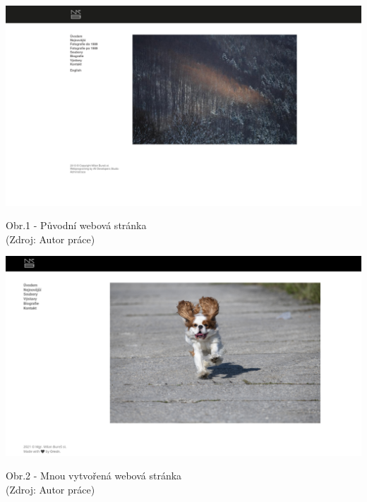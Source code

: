 \documentclass[12pt,a4paper]{report}
\begin{document}
  \vspace*{0.5cm}
  \noindent\includegraphics[width=\linewidth]{milanburescz.png}
  \begin{center}
    Obr.1 - Původní webová stránka \\
    (Zdroj: Autor práce)
  \end{center}
  \vspace*{0.5cm}
  \noindent\includegraphics[width=\linewidth]{dmp-bures.png}
  \begin{center}
    Obr.2 - Mnou vytvořená webová stránka  \\
    (Zdroj: Autor práce)
  \end{center}
  \vspace*{0.5cm}
\end{document}
